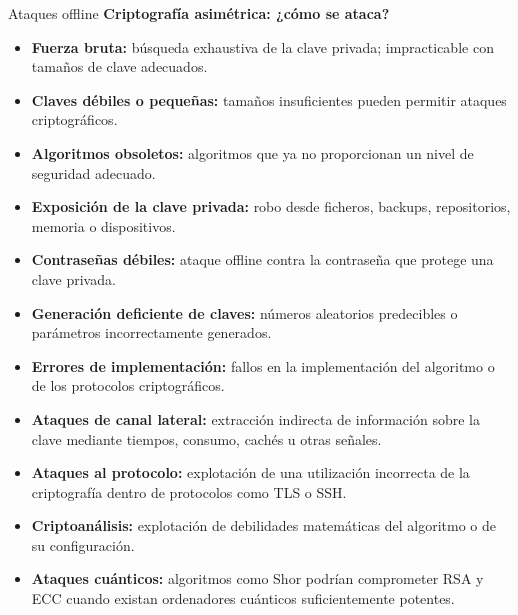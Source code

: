 \documentclass[aspectratio=169,11pt]{beamer}
\newcommand{\lead}[1]{{\bfseries #1}\par\medskip}
\begin{document}
\begin{frame}[allowframebreaks]{Ataques offline}
\small
\lead{Criptografía asimétrica: ¿cómo se ataca?}
\begin{itemize}
    \item \textbf{Fuerza bruta:} búsqueda exhaustiva de la clave privada; impracticable con tamaños de clave adecuados.
    
    \item \textbf{Claves débiles o pequeñas:} tamaños insuficientes pueden permitir ataques criptográficos.
    
    \item \textbf{Algoritmos obsoletos:} algoritmos que ya no proporcionan un nivel de seguridad adecuado.
    
    \item \textbf{Exposición de la clave privada:} robo desde ficheros, backups, repositorios, memoria o dispositivos.
    
    \item \textbf{Contraseñas débiles:} ataque offline contra la contraseña que protege una clave privada.
    
    \item \textbf{Generación deficiente de claves:} números aleatorios predecibles o parámetros incorrectamente generados.
    
    \item \textbf{Errores de implementación:} fallos en la implementación del algoritmo o de los protocolos criptográficos.
    
    \item \textbf{Ataques de canal lateral:} extracción indirecta de información sobre la clave mediante tiempos, consumo, cachés u otras señales.
    
    \item \textbf{Ataques al protocolo:} explotación de una utilización incorrecta de la criptografía dentro de protocolos como TLS o SSH.
    
    \item \textbf{Criptoanálisis:} explotación de debilidades matemáticas del algoritmo o de su configuración.
    
    \item \textbf{Ataques cuánticos:} algoritmos como Shor podrían comprometer RSA y ECC cuando existan ordenadores cuánticos suficientemente potentes.
\end{itemize}
\end{frame}
\end{document}
